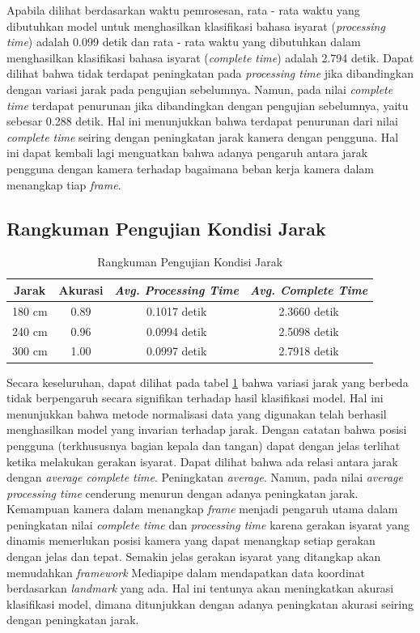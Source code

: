 Apabila dilihat berdasarkan waktu pemrosesan, rata - rata waktu yang dibutuhkan model untuk menghasilkan klasifikasi bahasa isyarat (\emph{processing time}) adalah 0.099 detik dan rata - rata waktu yang dibutuhkan dalam menghasilkan klasifikasi bahasa isyarat (\emph{complete time}) adalah 2.794 detik. Dapat dilihat bahwa tidak terdapat peningkatan pada \emph{processing time} jika dibandingkan dengan variasi jarak pada pengujian sebelumnya. Namun, pada nilai \emph{complete time} terdapat penurunan jika dibandingkan dengan pengujian sebelumnya, yaitu sebesar 0.288 detik. Hal ini menunjukkan bahwa terdapat penurunan dari nilai \emph{complete time} seiring dengan peningkatan jarak kamera dengan pengguna. Hal ini dapat kembali lagi menguatkan bahwa adanya pengaruh antara jarak pengguna dengan kamera terhadap bagaimana beban kerja kamera dalam menangkap tiap \emph{frame}.

\subsection{Rangkuman Pengujian Kondisi Jarak}
\label{sec:analisisrangkumanjarak}

\begin{longtable}{|c|c|c|c|}
  \caption{Rangkuman Pengujian Kondisi Jarak}
  \label{tb:evaluasiJarak}                                   \\
  \hline
  \rowcolor[HTML]{C0C0C0}
  \textbf{Jarak} & \textbf{Akurasi} & \emph{\textbf{Avg. Processing Time}} & \emph{\textbf{Avg. Complete Time}} \\
  \hline
  180 cm & 0.89 & 0.1017 detik & 2.3660 detik \\
  240 cm & 0.96 & 0.0994 detik & 2.5098 detik \\
  300 cm & 1.00 & 0.0997 detik & 2.7918 detik \\
  \hline
\end{longtable}

Secara keseluruhan, dapat dilihat pada tabel \ref{tb:evaluasiJarak} bahwa variasi jarak yang berbeda tidak berpengaruh secara signifikan terhadap hasil klasifikasi model. Hal ini menunjukkan bahwa metode normalisasi data yang digunakan telah berhasil menghasilkan model yang invarian terhadap jarak. Dengan catatan bahwa posisi pengguna (terkhususnya bagian kepala dan tangan) dapat dengan jelas terlihat ketika melakukan gerakan isyarat. Dapat dilihat bahwa ada relasi antara jarak dengan \emph{average complete time}. Peningkatan \emph{average}. Namun, pada nilai \emph{average processing time} cenderung menurun dengan adanya peningkatan jarak. Kemampuan kamera dalam menangkap \emph{frame} menjadi pengaruh utama dalam peningkatan nilai \emph{complete time} dan \emph{processing time} karena gerakan isyarat yang dinamis memerlukan posisi kamera yang dapat menangkap setiap gerakan dengan jelas dan tepat. Semakin jelas gerakan isyarat yang ditangkap akan memudahkan \emph{framework} Mediapipe dalam mendapatkan data koordinat berdasarkan \emph{landmark} yang ada. Hal ini tentunya akan meningkatkan akurasi klasifikasi model, dimana ditunjukkan dengan adanya peningkatan akurasi seiring dengan peningkatan jarak.

